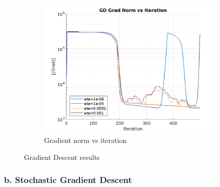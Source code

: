 \documentclass{article}
\begin{document}
\begin{figure}[H]
\begin{subfigure}[b]{0.3\textwidth}
    \label{fig:gd_cost}
  \end{subfigure}
  \begin{subfigure}[b]{0.3\textwidth}
    \centering
    \includegraphics[width=\textwidth]{images/gd_grad_norm_vs_iteration.png}
    \caption{Gradient norm vs iteration}
    \label{fig:gd_grad_norm}
  \end{subfigure}
  \caption{Gradient Descent results}
  \label{fig:gd_results}
\end{figure}

\subsubsection{b. Stochastic Gradient Descent}
\end{document}
